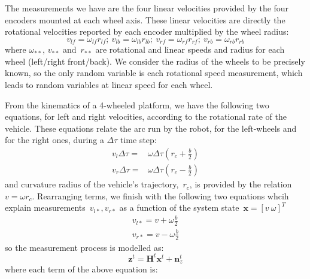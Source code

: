 The measurements we have are the four linear velocities provided by the four encoders mounted at each wheel axis. These linear velocities are directly the rotational velocities reported by each encoder multiplied by the wheel radius:
\begin{equation}
v_{lf} = \omega_{lf}r_{lf};\ v_{lb} = \omega_{lb}r_{lb};\ v_{rf} = \omega_{rf}r_{rf};\ v_{rb} = \omega_{rb}r_{rb}
\end{equation}
where $\omega_{**}$, $v_{**}$ and~$r_{**}$ are rotational and linear speeds and radius for each wheel (left/right front/back). We consider the radius of the wheels to be precisely known, so the only random variable is each rotational speed measurement, which leads to random variables at linear speed for each wheel. 

From the kinematics of a 4-wheeled platform, we have the following two equations, for left and right velocities, according to the rotational rate of the vehicle. These equations relate the arc run by the robot, for the left-wheels and for the right ones, during a $\Delta\tau$ time step:
\begin{equation}
\begin{array}{cc}
 v_l\Delta\tau = & \omega\Delta\tau(r_c+\frac{b}{2}) \\
 v_r\Delta\tau = & \omega\Delta\tau(r_c-\frac{b}{2}) 
\end{array}
\label{eq:v_l_v_r}
\end{equation}
and curvature radius of the vehicle's trajectory,~$r_c$, is provided by the relation~$v=\omega r_c$. Rearranging terms, we finish with the following two equations whcih explain measurements~$v_{l*},v_{r*}$ as a function of the system state~$\mathbf{x}=[v\ \omega]^T$
\begin{equation}
\begin{array}{cc}
 v_{l*} = v+\omega\frac{b}{2} \\
 v_{r*} = v-\omega\frac{b}{2}
\end{array}
\end{equation}
so the measurement process is modelled as:
\begin{equation}
 \mathbf{z}^t = \mathbf{H}^t\mathbf{x}^t + \mathbf{n}^t_z 
\end{equation}
where each term of the above equation is:
